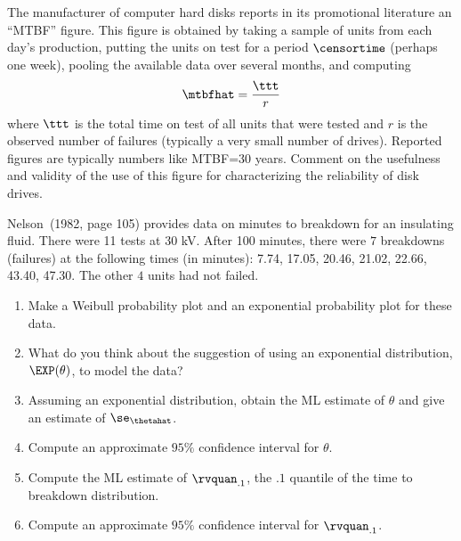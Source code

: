 \begin{exercise}
The manufacturer of computer hard disks reports in its promotional
literature
an ``MTBF'' figure. This figure is obtained by taking a sample of units
from each day's production, putting the units on test for a period
$\censortime$ (perhaps one week), pooling the available data over
several months, and computing
\begin{displaymath}
\mtbfhat = \frac{\ttt}{r}
\end{displaymath}
where $\ttt$ is the total time on test of all units that were tested
and $r$ is the observed number of failures (typically a very small
number of drives).  Reported figures are typically numbers like MTBF=30
years.  Comment on the usefulness and validity of the use of this
figure for characterizing the reliability of disk drives.
\end{exercise}


\begin{exercise}
Nelson~(1982, page 105) provides data on minutes to breakdown for an
insulating fluid. There were 11 tests at 30 kV.  After 100
minutes, there were $7$ breakdowns (failures) at the following times
(in minutes): 7.74, 17.05, 20.46, 21.02, 22.66, 43.40, 47.30. The
other $4$ units had not failed.
\begin{enumerate}
\item
Make a Weibull probability plot and an exponential probability plot for these data.
\item 
What do you think about the suggestion of using 
an exponential distribution, $\EXP(\theta)$, to model
the data? 
\item
Assuming an exponential distribution, obtain the ML estimate of 
$\theta$ and give an estimate of $\se_{\thetahat}$.
\item
Compute an approximate $95\%$ confidence interval for $\theta$.
\item
Compute the ML estimate of $\rvquan_{.1}$, the $.1$ quantile of the
time
to breakdown distribution.
\item
Compute an approximate $95\%$ confidence interval for $\rvquan_{.1}$.
\end{enumerate}
\end{exercise}


